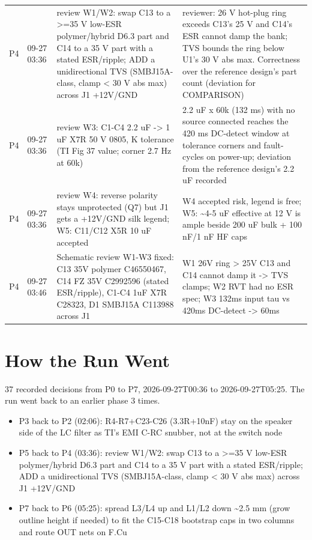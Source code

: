 \documentclass[11pt]{article}
\begin{document}
{\begin{longtable}{lp{1.6cm}p{6.2cm}p{6.2cm}}
P4 & 09-27 03:36 & review W1/W2: swap C13 to a \textgreater{}=35 V low-ESR polymer/hybrid D6.3 part and C14 to a 35 V part with a stated ESR/ripple; ADD a unidirectional TVS (SMBJ15A-class, clamp \textless{} 30 V abs max) across J1 +12V/GND & reviewer: 26 V hot-plug ring exceeds C13's 25 V and C14's ESR cannot damp the bank; TVS bounds the ring below U1's 30 V abs max. Correctness over the reference design's part count (deviation for COMPARISON) \\
P4 & 09-27 03:36 & review W3: C1-C4 2.2 uF -\textgreater{} 1 uF X7R 50 V 0805, K tolerance (TI Fig 37 value; corner 2.7 Hz at 60k) & 2.2 uF x 60k (132 ms) with no source connected reaches the 420 ms DC-detect window at tolerance corners and fault-cycles on power-up; deviation from the reference design's 2.2 uF recorded \\
P4 & 09-27 03:36 & review W4: reverse polarity stays unprotected (Q7) but J1 gets a +12V/GND silk legend; W5: C11/C12 X5R 10 uF accepted & W4 accepted risk, legend is free; W5: \textasciitilde{}4-5 uF effective at 12 V is ample beside 200 uF bulk + 100 nF/1 nF HF caps \\
P4 & 09-27 03:46 & Schematic review W1-W3 fixed: C13 35V polymer C46550467, C14 FZ 35V C2992596 (stated ESR/ripple), C1-C4 1uF X7R C28323, D1 SMBJ15A C113988 across J1 & W1 26V ring \textgreater{} 25V C13 and C14 cannot damp it -\textgreater{} TVS clamps; W2 RVT had no ESR spec; W3 132ms input tau vs 420ms DC-detect -\textgreater{} 60ms \\
\hline
\end{longtable}
}
\section{How the Run Went}
37 recorded decisions from P0 to P7, 2026-09-27T00:36 to 2026-09-27T05:25. The run went back to an earlier phase 3 times.
\begin{itemize}
\item P3 back to P2 (02:06): R4-R7+C23-C26 (3.3R+10nF) stay on the speaker side of the LC filter as TI's EMI C-RC snubber, not at the switch node
\item P5 back to P4 (03:36): review W1/W2: swap C13 to a \textgreater{}=35 V low-ESR polymer/hybrid D6.3 part and C14 to a 35 V part with a stated ESR/ripple; ADD a unidirectional TVS (SMBJ15A-class, clamp \textless{} 30 V abs max) across J1 +12V/GND
\item P7 back to P6 (05:25): spread L3/L4 up and L1/L2 down \textasciitilde{}2.5 mm (grow outline height if needed) to fit the C15-C18 bootstrap caps in two columns and route OUT nets on F.Cu
\end{itemize}
\end{document}
